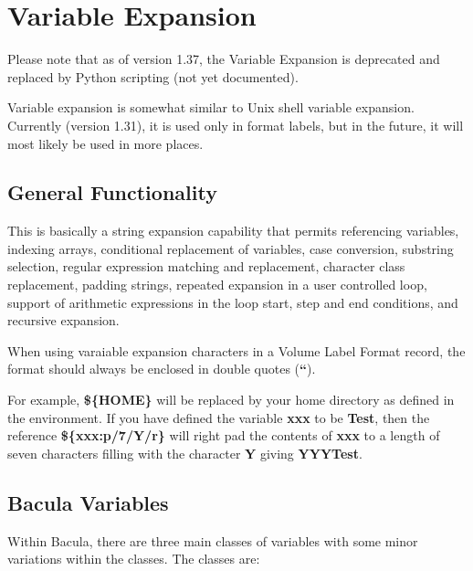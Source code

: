 
\section*{Variable Expansion}
\label{_ChapterStart50}

Please note that as of version 1.37, the Variable Expansion 
is deprecated and replaced by Python scripting (not yet
documented).

Variable expansion is somewhat similar to Unix shell variable expansion.
Currently (version 1.31), it is used only in format labels, but in the future,
it will most likely be used in more places. 

\subsection*{General Functionality}

This is basically a string expansion capability that permits referencing
variables, indexing arrays, conditional replacement of variables, case
conversion, substring selection, regular expression matching and replacement,
character class replacement, padding strings, repeated expansion in a user
controlled loop, support of arithmetic expressions in the loop start, step and
end conditions, and recursive expansion. 

When using varaiable expansion characters in a Volume Label Format record, the
format should always be enclosed in double quotes ({\bf ``}). 

For example, {\bf \$\{HOME\}} will be replaced by your home directory as
defined in the environment. If you have defined the variable {\bf xxx} to be
{\bf Test}, then the reference {\bf \$\{xxx:p/7/Y/r\}} will right pad the
contents of {\bf xxx} to a length of seven characters filling with the
character {\bf Y} giving {\bf YYYTest}. 

\subsection*{Bacula Variables}

Within Bacula, there are three main classes of variables with some minor
variations within the classes. The classes are: 

